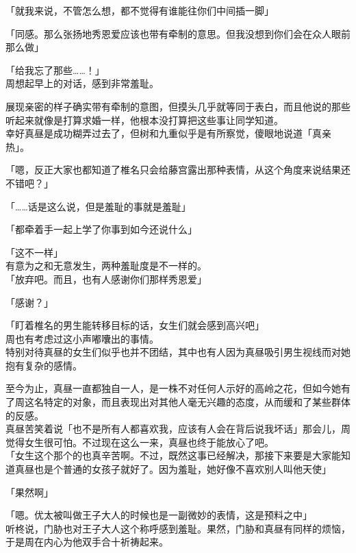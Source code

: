 「就我来说，不管怎么想，都不觉得有谁能往你们中间插一脚」

「同感。那么张扬地秀恩爱应该也带有牵制的意思。但我没想到你们会在众人眼前那么做」

「给我忘了那些……！」\\

周想起早上的对话，感到非常羞耻。

展现亲密的样子确实带有牵制的意图，但摸头几乎就等同于表白，而且他说的那些听起来就像是打算求婚一样，他根本没打算把这些事让同学知道。\\

幸好真昼是成功糊弄过去了，但树和九重似乎是有所察觉，傻眼地说道「真亲热」。

「嗯，反正大家也都知道了椎名只会给藤宫露出那种表情，从这个角度来说结果还不错吧？」

「……话是这么说，但是羞耻的事就是羞耻」

「都牵着手一起上学了你事到如今还说什么」

「这不一样」\\

有意为之和无意发生，两种羞耻度是不一样的。\\

「放弃吧。而且，也有人感谢你们那样秀恩爱」

「感谢？」

「盯着椎名的男生能转移目标的话，女生们就会感到高兴吧」\\

周也有考虑过这小声嘟囔出的事情。\\

特别对待真昼的女生们似乎也并不团结，其中也有人因为真昼吸引男生视线而对她抱有复杂的感情。

至今为止，真昼一直都独自一人，是一株不对任何人示好的高岭之花，但如今她有了周这名特定的对象，而且表现出对其他人毫无兴趣的态度，从而缓和了某些群体的反感。\\

真昼苦笑着说「也不是所有人都喜欢我，应该有人会在背后说我坏话」那会儿，周觉得女生很可怕。不过现在这么一来，真昼也终于能放心了吧。\\

「女生这个那个的也真辛苦啊。不过，既然这事已经解决，那接下来要是大家能知道真昼也是个普通的女孩子就好了。因为羞耻，她好像不喜欢别人叫他天使」

「果然啊」

「嗯。优太被叫做王子大人的时候也是一副微妙的表情，这是预料之中」\\

听柊说，门胁也对王子大人这个称呼感到羞耻。果然，门胁和真昼有同样的烦恼，于是周在内心为他双手合十祈祷起来。\\


